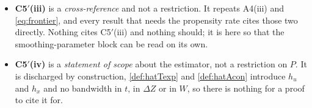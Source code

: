 \begin{itemize}
across the $h_x$ window that C5$'$(ii) and (P-g) leave. Both are computed at the strengthened form of the
clause and at $s=3$, where \eqref{eq:hxwindow} holds with room, so both stand. So C5$'$(ii) is consumed
\emph{arithmetically} and not as a hypothesis, and the two readings must be kept apart: an auditor grepping
hypothesis lists will find nothing, and deleting the clause would nonetheless leave two displays without a
lower limit. \emph{And a lower bound stated more strongly than any proof needs is \textbf{not} free here},
which is the correction \eqref{eq:hxwindow} records: it must intersect the upper bound (P-g) imports, and the
strengthened form and (P-g) have no common solution at any $s\le\tfrac12+18\alpha/(8-3\alpha)$, 
a band that is non-empty at every $\alpha\in(\tfrac14,\approx0.359)$, and \eqref{eq:frontier} forces
$\alpha>\tfrac14$.
\item[--] \textbf{C5$'$(iii)} is a \emph{cross-reference} and not a restriction. It repeats A4(iii) and
\eqref{eq:frontier}, and every result that needs the propensity rate cites those two directly. Nothing cites
C5$'$(iii) and nothing should; it is here so that the smoothing-parameter block can be read on its own.
\item[--] \textbf{C5$'$(iv)} is a \emph{statement of scope} about the estimator, not a restriction on
$P$. It is
discharged by construction, \cref{def:hatTexp} and \cref{def:hatAcon} introduce $h_u$ and $h_x$ and no
bandwidth in $t$, in $\Delta Z$ or in $W$, so there is nothing for a proof to cite it for.
\end{itemize}
